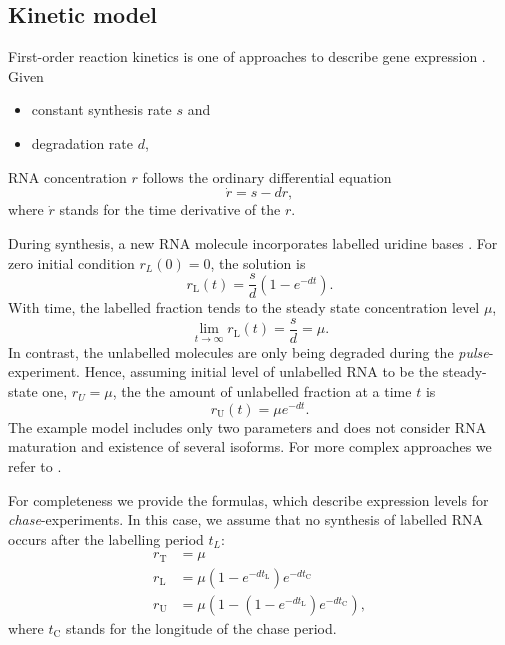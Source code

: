 \subsection{Kinetic model}
First-order reaction kinetics  is one of approaches to describe gene expression 
\citep{kaern2005stochasticity}.
Given
\begin{itemize}
 \item constant synthesis rate $s$ and
\item degradation rate $d$, 
\end{itemize}
RNA concentration $r$ follows the ordinary differential equation
\begin{equation}
 \dot{r} = s - dr,
\end{equation}
where $\dot{r}$ stands for the time derivative of the $r$\cite{A}.
\par
During synthesis, a new RNA molecule incorporates labelled uridine bases 
\cite{A}.
For zero initial condition $r_L(0) = 0$, the solution is
\begin{equation}
 r_\text{L}(t) = \frac{s}{d}\left(1 - e^{-dt}\right). \label{eq:labelled}
\end{equation}
With time, the labelled fraction tends to the steady state concentration
level $\mu$, 
\begin{equation}
\lim_{t\to\infty} r_\text{L}(t) = \frac{s}{d} = \mu.
\end{equation}
In contrast, the unlabelled molecules are only being degraded during the 
\emph{pulse}-experiment.
Hence, assuming initial level of unlabelled RNA to be the steady-state one, 
$r_U = \mu$,
the the amount of unlabelled fraction at a time $t$ is
\begin{equation}
 r_\text{U}(t) = \mu e^{-dt}.
\end{equation}
The example model includes only two parameters and does not consider
RNA maturation and existence of several isoforms.
For more complex approaches we refer to \cite{A}.
\par
For completeness we provide the formulas,
which describe expression levels for \emph{chase}-experiments.
In this case, we assume that no synthesis of labelled RNA occurs after 
the labelling period $t_L$:
\begin{align}
 r_\text{T}&=\mu\\
 r_\text{L}&=\mu \left(1-e^{-dt_\text{L}}\right)e^{-dt_\text{C}}\\
 r_\text{U}&=\mu \left(1-\left(1-e^{-dt_\text{L}}\right)e^{-dt_\text{C}}\right),
\end{align}
where $t_\text{C}$ stands for the longitude of the chase period.
\par

